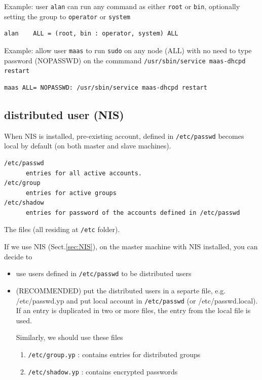 Example: user \verb!alan! can run any command as either \verb!root! or
\verb!bin!, optionally setting	the group to \verb!operator! or \verb!system!
\begin{verbatim}
alan	ALL = (root, bin : operator, system) ALL
\end{verbatim}

Example: allow user \verb!maas! to run \verb!sudo! on any node (ALL) with no
need to type password (NOPASSWD) on the commmand 
\verb!/usr/sbin/service maas-dhcpd restart! 

\begin{verbatim}
maas ALL= NOPASSWD: /usr/sbin/service maas-dhcpd restart
\end{verbatim}

\subsection{distributed user (NIS)}

When NIS is installed, pre-existing account, defined in \verb!/etc/passwd!
becomes local by default (on both master and slave machines).
\begin{verbatim}
/etc/passwd 
      entries for all active accounts.
/etc/group 
      entries for active groups
/etc/shadow
      entries for password of the accounts defined in /etc/passwd      
\end{verbatim}
The files (all residing at \verb!/etc! folder).

If we use NIS (Sect.\ref{sec:NIS}), on the master machine with NIS installed,
you can decide to
\begin{itemize}
  \item  use users defined in \verb!/etc/passwd! to be distributed users

  \item (RECOMMENDED) put the distributed users in a separte file, e.g. 
/etc/passwd.yp  and put local account in \verb!/etc/passwd! (or
/etc/passwd.local). If an entry is duplicated in two or more files, the entry
from the local file is used.

Similarly, we should use these files
\begin{enumerate}
  \item \verb!/etc/group.yp! : contains entries for distributed groups
  \item \verb!/etc/shadow.yp! : contains encrypted passwords
\end{enumerate}

\end{itemize}

